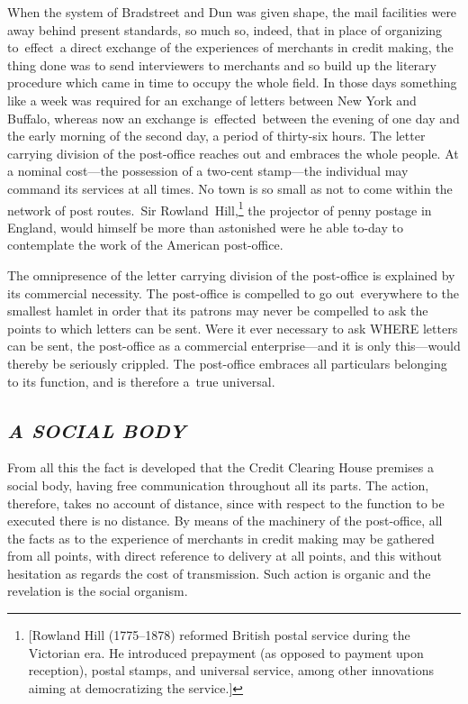 \documentclass[openany,nobib]{tufte-book}
\begin{document}
When the system of Bradstreet and Dun was given shape, the mail
facilities were away behind present standards, so much so, indeed, that
in place of organizing to~effect~a direct exchange of the experiences of
merchants in credit making, the thing done was to send interviewers to
merchants and so build up the literary procedure which came in time to
occupy the whole field. In those days something like a week was required
for an exchange of letters between New York and Buffalo, whereas now an
exchange is~effected~between the evening of one day and the early
morning of the second day, a period of thirty-six hours. The letter
carrying division of the post-office reaches out and embraces the whole
people. At a nominal cost---the possession of a two-cent stamp---the
individual may command its services at all times. No town is so small as
not to come within the network of post routes.~Sir
Rowland~Hill,\footnote{{[}Rowland Hill (1775--1878) reformed British
  postal service during the Victorian era. He introduced prepayment (as
  opposed to payment upon reception), postal stamps, and universal
  service, among other innovations aiming at democratizing the
  service.{]}} the projector of penny postage in England, would himself
be more than astonished were he able to-day to contemplate the work of
the American post-office.~

The omnipresence of the letter carrying division of the post-office is
explained by its commercial necessity. The post-office is compelled to
go out~everywhere to the smallest hamlet in order that its patrons may
never be compelled to ask the points to which letters can be sent. Were
it ever necessary to ask WHERE letters can be sent, the post-office as a
commercial enterprise---and it is only this---would thereby be seriously
crippled. The post-office embraces all particulars belonging to its
function, and is therefore a~true universal.~

\hypertarget{a-social-body}{%
\subsection{\texorpdfstring{\emph{A SOCIAL
BODY}}{A SOCIAL BODY}}\label{a-social-body}}

From all this the fact is developed that the Credit Clearing House
premises a social body, having free communication throughout all its
parts. The action, therefore, takes no account of distance, since with
respect to the function to be executed there is no distance. By means of
the machinery of the post-office, all the facts as to the experience of
merchants in credit making may be gathered from all points, with direct
reference to delivery at all points, and this without hesitation as
regards the cost of transmission. Such action is organic and the
revelation is the social organism.~
\end{document}

